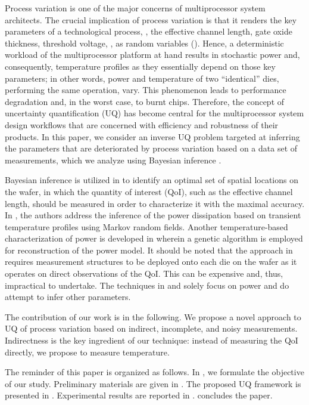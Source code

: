 Process variation is one of the major concerns of multiprocessor system architects. The crucial implication of process variation is that it renders the key parameters of a technological process, \eg, the effective channel length, gate oxide thickness, threshold voltage, \etc, as random variables (\rvs). Hence, a deterministic workload of the multiprocessor platform at hand results in stochastic power and, consequently, temperature profiles as they essentially depend on those key parameters; in other words, power and temperature of two ``identical'' dies, performing the same operation, vary. This phenomenon leads to performance degradation and, in the worst case, to burnt chips. Therefore, the concept of uncertainty quantification (UQ) has become central for the multiprocessor system design workflows that are concerned with efficiency and robustness of their products. In this paper, we consider an inverse UQ problem targeted at inferring the parameters that are deteriorated by process variation based on a data set of measurements, which we analyze using Bayesian inference \cite{gelman2004}.

Bayesian inference is utilized in \cite{zhang2010} to identify an optimal set of spatial locations on the wafer, in which the quantity of interest (QoI), such as the effective channel length, should be measured in order to characterize it with the maximal accuracy. In \cite{paek2012}, the authors address the inference of the power dissipation based on transient temperature profiles using Markov random fields. Another temperature-based characterization of power is developed in \cite{mesa-martinez2007} wherein a genetic algorithm is employed for reconstruction of the power model. It should be noted that the approach in \cite{zhang2010} requires measurement structures to be deployed onto each die on the wafer as it operates on direct observations of the QoI. This can be expensive and, thus, impractical to undertake. The techniques in \cite{paek2012} and \cite{mesa-martinez2007} solely focus on power and do attempt to infer other parameters.

The contribution of our work is in the following. We propose a novel approach to UQ of process variation based on indirect, incomplete, and noisy measurements. Indirectness is the key ingredient of our technique: instead of measuring the QoI directly, we propose to measure temperature.

The reminder of this paper is organized as follows. In , we formulate the objective of our study. Preliminary materials are given in . The proposed UQ framework is presented in . Experimental results are reported in .  concludes the paper.
